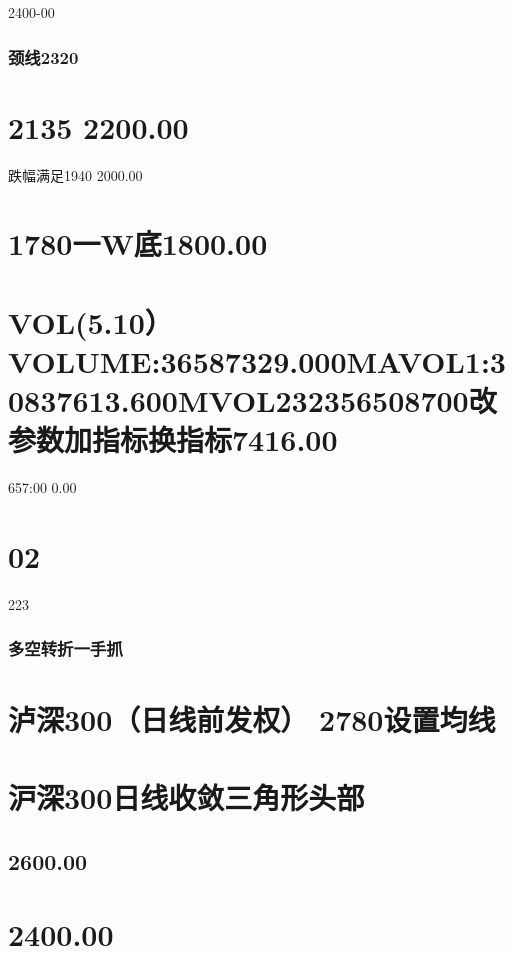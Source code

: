 \documentclass{article}
\begin{document}
2400-00

\subsubsection{颈线2320}

\section{2135 2200.00}

跌幅满足1940 2000.00

\section{1780一W底1800.00}

\section{VOL(5.10）VOLUME:36587329.000MAVOL1:30837613.600MVOL232356508700改参数加指标换指标7416.00}

657:00 0.00

\section{02}

223

\clearpage

\subsubsection{多空转折一手抓}

\section{泸深300（日线前发权） 2780设置均线}

\section{沪深300日线收敛三角形头部}

\subsection{2600.00}

\section{2400.00}
\end{document}
